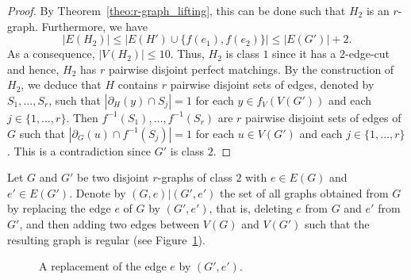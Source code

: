 \documentclass[a4paper,11pt]{article}
\theoremstyle{remark}
\begin{document}
\begin{proof}
By Theorem~\ref{theo:r-graph_lifting}, this can be done such that $H_2$ is an $r$-graph. 
	Furthermore, we have $$|E(H_2)| \leq |E(H') \cup \{f(e_1), f(e_2)\}| \leq |E(G')|+2.$$
	As a consequence, $|V(H_2)|\leq 10$. Thus, $ H_2 $ is class $ 1 $ since it has a $ 2 $-edge-cut and hence, $ H_2 $ has $ r $ pairwise disjoint perfect matchings. By the construction of $ H_2 $, we deduce that $ H $ contains  $ r $ pairwise disjoint sets of edges, denoted by  $ S_1,\ldots,S_r $, such that  $|\partial_H(y)\cap S_j|=1$ for each $y\in f_V(V(G'))$  and each $ j\in\{1,\ldots,r\} $. Then $ f^{-1}(S_1), \ldots,  f^{-1}(S_r)$ are  $ r $ pairwise disjoint sets  of edges of $ G $ such that  $|\partial_G(u )\cap f^{-1}(S_j)|=1$ for each $u\in V(G')$  and each $ j\in\{1,\ldots,r\} $. This is a contradiction since $ G' $ is class $ 2 $.
\end{proof}

Let $ G $ and $ G' $ be two disjoint $ r $-graphs  of class $ 2 $  with $ e\in E(G) $ and $ e'\in E(G') $. Denote by $ (G,e)| (G',e')$  the set of all  graphs obtained from $ G $ by replacing the edge $ e $ of $ G $ by $ (G',e')$, that is,  deleting $ e $ from $ G $ and $ e' $ from $ G' $, and then adding two edges between $ V(G) $ and $ V(G') $ such that the resulting graph is regular (see Figure~\ref{fig:replacing_edge}).


\begin{figure}[htbp]
\centering
{} 
\caption{A replacement of the edge $e$ by $(G',e')$.}
\label{fig:replacing_edge}
\end{figure}
\end{document}
